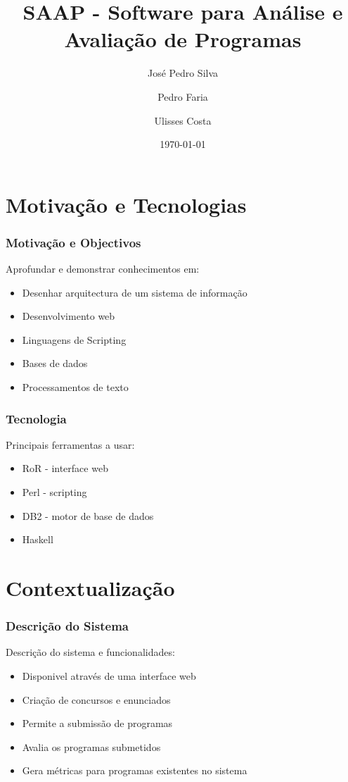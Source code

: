\documentclass{beamer}
\title{SAAP - Software para Análise e Avaliação de Programas}
\author{José Pedro Silva \and
Pedro Faria \and
Ulisses Costa
}
\date{\today}
\institute{Engenharia de Linguagens\\
Projecto integrado
}
\begin{document}
\begin{frame}
   \titlepage
\end{frame}

\section{Motivação e Tecnologias}

\begin{frame} \frametitle{Motivação e Objectivos}
Aprofundar e demonstrar conhecimentos em:
\begin{itemize}
\item Desenhar arquitectura de um sistema de informação
\item Desenvolvimento web
\item Linguagens de Scripting
\item Bases de dados
\item Processamentos de texto
\end{itemize}
\end{frame}

\begin{frame} \frametitle{Tecnologia}
Principais ferramentas a usar:
\begin{itemize}
\item RoR - interface web
\item Perl - scripting
\item DB2 - motor de base de dados
\item Haskell
\end{itemize}
\end{frame}

\section{Contextualização}
\begin{frame} \frametitle{Descrição do Sistema}
Descrição do sistema e funcionalidades:
\begin{itemize}
\item Disponivel através de uma interface web
\item Criação de concursos e enunciados
\item Permite a submissão de programas
\item Avalia os programas submetidos
\item Gera métricas para programas existentes no sistema
\end{itemize}
\end{frame}
\end{document}
